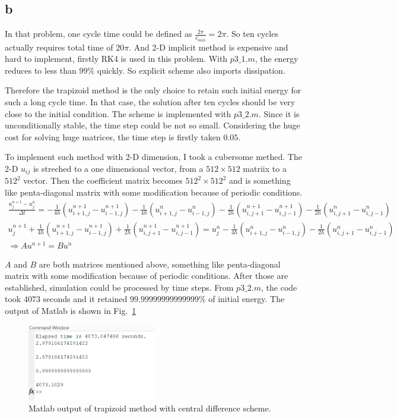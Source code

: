 \documentclass[letterpaper,10pt]{article}
\begin{document}
\subsection{b}
In that problem, one cycle time could be defined as $\frac{2\pi}{c_{min}}=2\pi$. So ten cycles actually requires total time of $20\pi$. 
And 2-D implicit method is expensive and hard to implement, firstly RK4 is used in this problem. With $p3\_1.m$, the energy reduces to less than $99\%$ quickly. 
So explicit scheme also imports dissipation. 

Therefore the trapizoid method is the only choice to retain such initial energy for such a long cycle time. In that case, 
the solution after ten cycles should be very close to the initial condition. The scheme is implemented with $p3\_2.m$. Since it is unconditionally stable, 
the time step could be not so small. Considering the huge cost for solving huge matrices, the time step is firstly taken $0.05$. 

To implement such method with 2-D dimension, I took a cubersome methed. The 2-D $u_{ij}$ is streched to a one dimensional vector, from a $512\times 512$ matriix 
to a $512^2$ vector. Then the coefficient matrix becomes $512^2\times 512^2$ and is something like penta-diagonal matrix with some modification because of 
periodic conditions. 
\begin{align*}
  \frac{u_j^{n+1}-u_j^n}{\Delta t}=-\frac{1}{4h}\left(u^{n+1}_{i+1,j}-u^{n+1}_{i-1,j}\right)-\frac{1}{4h}\left(u^{n}_{i+1,j}-u^{n}_{i-1,j}\right)
  -\frac{1}{2h}\left(u^{n+1}_{i,j+1}-u^{n+1}_{i,j-1}\right)-\frac{1}{2h}\left(u^{n}_{i,j+1}-u^{n}_{i,j-1}\right)&\\
  u_j^{n+1}+\frac{1}{4h}\left(u^{n+1}_{i+1,j}-u^{n+1}_{i-1,j}\right)+\frac{1}{2h}\left(u^{n+1}_{i,j+1}-u^{n+1}_{i,j-1}\right)=
  u_j^n-\frac{1}{4h}\left(u^{n}_{i+1,j}-u^{n}_{i-1,j}\right)-\frac{1}{2h}\left(u^{n}_{i,j+1}-u^{n}_{i,j-1}\right)&\\
  \Rightarrow A u^{n+1} = B u^n&
\end{align*}

$A$ and $B$ are both matrices mentioned above, something like penta-diagonal matrix with some modification because of periodic conditions. 
After those are established, simulation could be processed by time steps. From $p3\_2.m$, the code took $4073$ seconds and it retained $99.99999999999999\%$ 
of initial energy. The output of Matlab is shown in Fig.~\ref{fig3_1}
\begin{figure}[h]
  \centering
  \includegraphics[width=0.5\textwidth]{p3_1.png}
  \caption{Matlab output of trapizoid method with central difference scheme. }
  \label{fig3_1}
\end{figure}
\end{document}
